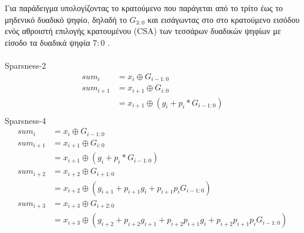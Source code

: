 Για παράδειγμα υπολογίζοντας το κρατούμενο που παράγεται από το τρίτο έως το 
μηδενικό δυαδικό ψηφίο, δηλαδή το $G_{3:0}$ και εισάγωντας στο στο κρατούμενο 
εισόδου ενός αθροιστή επιλογής κρατουμένου (CSA) των τεσσάρων δυαδικών ψηφίων 
με είσοδο τα δυαδικά ψηφία $7:0$ \cite{Sparseness_ling}.
\\\\ 
Sparsness-2
\begin{equation*}
    \begin{split}
        sum_i &= x_i \oplus G_{i-1:0}\\
        sum_{i+1} &= x_{i+1} \oplus G_{i:0}\\
        &= x_{i+1} \oplus (g_i + p_i*G_{i-1:0})\\
    \end{split} 
\end{equation*}
Sparsness-4
\begin{equation*}
    \begin{split}
        sum_i &= x_i \oplus G_{i-1:0}\\
        sum_{i+1} &= x_{i+1} \oplus G_{i:0}\\
        &= x_{i+1} \oplus (g_i + p_i*G_{i-1:0})\\
        sum_{i+2} &= x_{i+2} \oplus G_{i+1:0}\\
        &= x_{i+2} \oplus (g_{i+1} + p_{i+1}g_i + p_{i+1}p_iG_{i-1:0})\\
        sum_{i+3} &= x_{i+3} \oplus G_{i+2:0}\\
        &= x_{i+3} \oplus (g_{i+2} + p_{i+2}g_{i+1} + p_{i+2}p_{i+1}g_i + p_{i+2}p_{i+1}p_iG_{i-1:0})\\
    \end{split} 
\end{equation*}


















